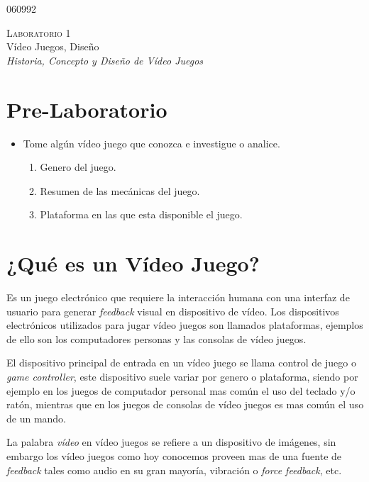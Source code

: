 060992\begin{center}
\textsc{\Large Laboratorio 1}~\\
{\large Vídeo Juegos, Diseño}~\\
\emph{Historia, Concepto y Diseño de Vídeo Juegos}
\end{center}

\section{Pre-Laboratorio}
\begin{itemize}
\item Tome algún vídeo juego que conozca e investigue o analice.
\begin{enumerate}
  \item Genero del juego.
  \item Resumen de las mecánicas del juego.
  \item Plataforma en las que esta disponible el juego.
\end{enumerate}
\end{itemize}
\section{¿Qué es un Vídeo Juego?}
Es un juego electrónico que requiere la interacción humana con una interfaz de usuario para generar \emph{feedback} visual en dispositivo de vídeo. Los dispositivos electrónicos utilizados para jugar vídeo juegos son llamados plataformas, ejemplos de ello son los computadores personas y las consolas de vídeo juegos.

El dispositivo principal de entrada en un vídeo juego se llama control de juego o \emph{game controller}, este dispositivo suele variar por genero o plataforma, siendo por ejemplo en los juegos de computador personal mas común el uso del teclado y/o ratón, mientras que en los juegos de consolas de vídeo juegos es mas común el uso de un mando.

La palabra \emph{vídeo} en vídeo juegos se refiere a un dispositivo de imágenes, sin embargo los vídeo juegos como hoy conocemos proveen mas de una fuente de \emph{feedback} tales como audio en su gran mayoría, vibración o \emph{force feedback}, etc.



